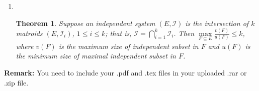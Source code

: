 \documentclass[12pt,a4paper]{article}
\makeatletter
\newtheorem{theorem}{Theorem}
\newtheorem*{solution}{Solution}
\theoremstyle{definition}
\renewenvironment{solution}[1][Solution] {\par\pushQED{\qed}\normalfont\topsep6\p@\@plus6\p@\relax\trivlist\item[\hskip\labelsep\bfseries#1\@addpunct{.}]\ignorespaces}{\popQED\endtrivlist\@endpefalse} \makeatother
\makeatother
\begin{document}
\begin{enumerate}
\begin{solution}
\begin{enumerate}
    	\end{enumerate}
    	 \end{solution}
    \begin{theorem} \label{Thm-Intersect}
        Suppose an independent system $(E, \mathcal{I})$ is the intersection of $k$ matroids $\left(E, \mathcal{I}_{i}\right)$, $1 \leq i \leq k$; that is, $\mathcal{I}=\bigcap_{i=1}^{k} \mathcal{I}_{i}$. Then $\max\limits_{F \subseteq E} \frac{v(F)}{u(F)} \leq k$, where $v(F)$ is the maximum size of independent subset in $F$ and $u(F)$ is the minimum size of maximal independent subset in $F$.
    \end{theorem}    
\end{enumerate}

\vspace{20pt}

\textbf{Remark:} You need to include your .pdf and .tex files in your uploaded .rar or .zip file.

\end{document}

